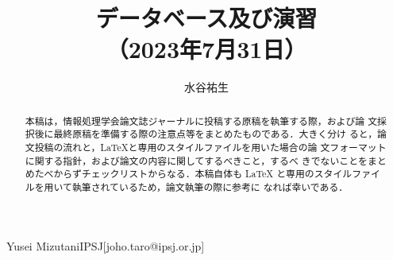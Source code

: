 \documentclass[submit,techrep]{ipsj}
\begin{document}
\title{データベース及び演習\\
（2023年7月31日）}





\author{水谷祐生}{Yusei Mizutani}{IPSJ}[joho.taro@ipsj.or.jp]

\begin{abstract}
本稿は，情報処理学会論文誌ジャーナルに投稿する原稿を執筆する際，および論
文採択後に最終原稿を準備する際の注意点等をまとめたものである．大きく分け
ると，論文投稿の流れと，\LaTeX と専用のスタイルファイルを用いた場合の論
文フォーマットに関する指針，および論文の内容に関してするべきこと，するべ
きでないことをまとめたべからずチェックリストからなる．本稿自体も \LaTeX 
と専用のスタイルファイルを用いて執筆されているため，論文執筆の際に参考に
なれば幸いである．
\end{abstract}

%
%
%

\maketitle

\end{document}

